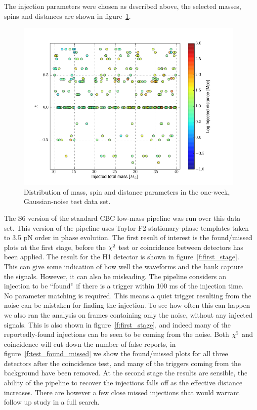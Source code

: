 The injection parameters were chosen as described above, the selected
masses, spins and distances are shown in
figure~\ref{f:ninja2_test_dataset}.

\begin{figure}
  \includegraphics[width=\linewidth]{figures/ninja2_results/ninja2_test_dataset.png}
  \caption[Parameters of the NINJA-2 test one-week data set]{
  \label{f:ninja2_test_dataset}
Distribution of mass, spin and distance parameters in the one-week,
Gaussian-noise test data set.
}
\end{figure}%


The S6 version of the standard CBC low-mass pipeline was run over this
data set.  This version of the pipeline uses Taylor F2
stationary-phase templates taken to 3.5 pN order in phase evolution.
The first result of interest is the found/missed plots at the first
stage, before the $\chi^2$ test or coincidence between detectors has
been applied.  The result for the H1 detector is shown in
figure~\ref{f:first_stage}.  This can give some indication of how well
the waveforms and the bank capture the signals.  However, it can also
be misleading.  The pipeline considers an injection to be ``found'' if
there is a trigger within 100 ms of the injection time.  No parameter
matching is required.  This means a quiet trigger resulting from the
noise can be mistaken for finding the injection.  To see how often
this can happen we also ran the analysis on frames containing only the
noise, without any injected signals.  This is also shown in
figure~\ref{f:first_stage}, and indeed many of the reportedly-found
injections can be seen to be coming from the noise.  Both $\chi^2$ and
coincidence will cut down the number of false reports, in
figure~\ref{f:test_found_missed} we show the found/missed plots for
all three detectors after the coincidence test, and many of the
triggers coming from the background have been removed.  At the second
stage the results are sensible, the ability of the pipeline to recover
the injections falls off as the effective distance increases.  There
are however a few close missed injections that would warrant follow up
study in a full search.


